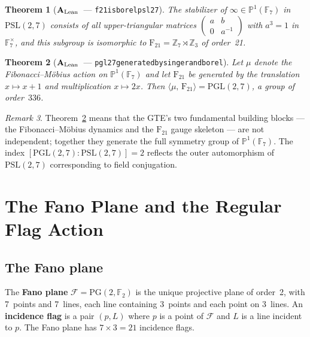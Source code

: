 \documentclass[11pt]{article}
\newtheorem{theorem}{Theorem}[section]
\theoremstyle{remark}
\newtheorem{remark}[theorem]{Remark}
\newcommand{\lean}[1]{%
  \penalty-100
  \begingroup\def\_{\textunderscore\allowbreak}\texttt{#1}\endgroup}
\newcommand{\PSLtwo}{\ensuremath{\mathrm{PSL}(2,7)}}
\newcommand{\PGLtwo}{\ensuremath{\mathrm{PGL}(2,7)}}
\newcommand{\FineSeven}{\ensuremath{\mathrm{F}_{21}}}
\newcommand{\Zcyc}[1]{\ensuremath{\mathbb{Z}_{#1}}}
\newcommand{\ProjLine}{\ensuremath{\mathbb{P}^1(\mathbb{F}_7)}}
\newcommand{\CatAL}{\ensuremath{\textbf{A}_{\rm Lean}}}
\begin{document}
\begin{theorem}[\CatAL\ --- \lean{f21\_is\_borel\_psl27}]
\label{thm:borel}
The stabilizer of $\infty \in \ProjLine$ in $\PSLtwo$ consists of all
upper-triangular matrices $\begin{pmatrix} a & b \\ 0 & a^{-1} \end{pmatrix}$
with $a^3 = 1$ in $\mathbb{F}_7^{\times}$, and this subgroup is isomorphic to
$\FineSeven = \Zcyc{7} \rtimes \Zcyc{3}$ of order~21.
\end{theorem}

\begin{theorem}[\CatAL\ --- \lean{pgl27\_generated\_by\_singer\_and\_borel}]
\label{thm:pgl_gen}
Let $\mu$ denote the Fibonacci--Möbius action on $\ProjLine$ and let $\FineSeven$
be generated by the translation $x \mapsto x+1$ and multiplication $x \mapsto 2x$.
Then $\langle \mu,\, \FineSeven \rangle = \PGLtwo$, a group of order~$336$.
\end{theorem}

\begin{remark}
Theorem~\ref{thm:pgl_gen} means that the GTE's two fundamental building blocks
--- the Fibonacci--Möbius dynamics and the $\FineSeven$ gauge skeleton --- are not
independent; together they generate the full symmetry group of $\ProjLine$.
The index $[\PGLtwo : \PSLtwo] = 2$ reflects the outer automorphism of $\PSLtwo$
corresponding to field conjugation.
\end{remark}

\section{The Fano Plane and the Regular Flag Action}
\label{sec:fano}

\subsection{The Fano plane}

The \textbf{Fano plane} $\mathcal{F} = \mathrm{PG}(2, \mathbb{F}_2)$ is the
unique projective plane of order~2, with 7~points and 7~lines, each line
containing 3~points and each point on 3~lines.
An \textbf{incidence flag} is a pair $(p, L)$ where $p$ is a point of $\mathcal{F}$
and $L$ is a line incident to $p$.
The Fano plane has $7 \times 3 = 21$ incidence flags.
\end{document}
